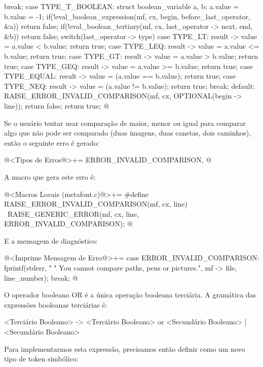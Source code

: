 {{{{{{{{{{{      }          
      break;
    }
    case TYPE_T_BOOLEAN:
    {
      struct boolean_variable a, b;
      a.value = b.value = -1;
      if(!eval_boolean_expression(mf, cx, begin, before_last_operator, &a))
        return false;
      if(!eval_boolean_tertiary(mf, cx, last_operator -> next, end, &b))
        return false;
      switch(last_operator -> type){
      case TYPE_LT:
        result -> value = a.value < b.value;
        return true;
      case TYPE_LEQ:
        result -> value = a.value <= b.value;
        return true;
      case TYPE_GT:
        result -> value = a.value > b.value;
        return true;
      case TYPE_GEQ:
        result -> value = a.value >= b.value;
        return true;
      case TYPE_EQUAL:
        result -> value = (a.value == b.value);
        return true;
      case TYPE_NEQ:
        result -> value = (a.value != b.value);
        return true;
      }
      break;
    }
    default:
      RAISE_ERROR_INVALID_COMPARISON(mf, cx, OPTIONAL(begin -> line));
      return false;
    }
    return true;
  }
}
@
\fimcodigo

Se o usuário tentar usar comparação de maior, menor ou igual para
comparar algo que não pode ser comparado (duas imagens, duas canetas,
dois caminhos), então o seguinte erro é gerado:

\iniciocodigo
@<Tipos de Erros@>+=
ERROR_INVALID_COMPARISON,
@
\fimcodigo

A macro que gera este erro é:

\iniciocodigo
@<Macros Locais (metafont.c)@>+=
#define RAISE_ERROR_INVALID_COMPARISON(mf, cx, line) {\
    RAISE_GENERIC_ERROR(mf, cx, line, ERROR_INVALID_COMPARISON);}
@
\fimcodigo

E a mensagem de diagnóstico:

\iniciocodigo
@<Imprime Mensagem de Erro@>+=
case ERROR_INVALID_COMPARISON:
  fprintf(stderr,
          "%
          " You cannot compare paths, pens or pictures.",
          mf -> file, line_number);
  break;
@
\fimcodigo


O operador booleano OR é a única operação booleana terciária. A
gramática das expressões booleanas terciárias é:

\alinhaverbatim
<Terciário Booleano> -> <Terciário Booleano> or <Secundário Booleano> |
                        <Secundário Booleano>
\alinhanormal

Para implementarmos esta expressão, precisamos então
definir  como um novo tipo de token simbólico:

}}}}}}
